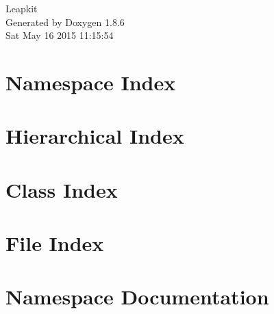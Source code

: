 \documentclass[twoside]{book}
\newcommand{\clearemptydoublepage}{%
  \newpage{\pagestyle{empty}\cleardoublepage}%
}
\begin{document}
\hypersetup{pageanchor=false}
\begin{titlepage}
\vspace*{7cm}
\begin{center}%
{\Large Leapkit }\\
\vspace*{1cm}
{\large Generated by Doxygen 1.8.6}\\
\vspace*{0.5cm}
{\small Sat May 16 2015 11:15:54}\\
\end{center}
\end{titlepage}
\clearemptydoublepage
\tableofcontents
\clearemptydoublepage
{}
\hypersetup{pageanchor=true}

\chapter{Namespace Index}

\chapter{Hierarchical Index}

\chapter{Class Index}

\chapter{File Index}

\chapter{Namespace Documentation}




















\end{document}
